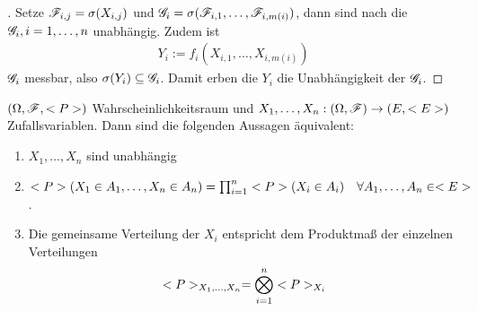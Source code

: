 \begin{proof}[]
	Setze $\F_{i,j} = \sigma(X_{i,j})$ und $\G_i = \sigma(\F_{i,1}, \dots, \F_{i,m(i)})$, dann sind nach  die $\G_i, i = 1,\dots,n$ unabhängig. Zudem ist
	\begin{align*}
	Y_i := f_i(X_{i,1}, \dots, X_{i,m(i)})
	\end{align*}
	$\G_i$ messbar, also $\sigma(Y_i) \subseteq \G_i$. Damit erben die $Y_i$ die Unabhängigkeit der $\G_i$.
\end{proof}
\begin{proposition}
	$(\O, \F, \P)$ Wahrscheinlichkeitsraum und $X_1, \dots, X_n: (\O,\F) \to (E, \E)$ Zufallsvariablen. Dann sind die folgenden Aussagen äquivalent:
	\begin{enumerate}
		\item $X_1, \dots, X_n$ sind unabhängig \label{prop:unabhZV1}
		\item $\P(X_1 \in A_1, \dots, X_n \in A_n) = \prod_{i=1}^n \P(X_i \in A_i)\quad \forall A_1, \dots, A_n \in \E$. \label{prop:unabhZV2}
		\item Die gemeinsame Verteilung der $X_i$ entspricht dem Produktmaß der einzelnen Verteilungen \label{prop:unabhZV3}
		\begin{align*}
			\P_{X_1, \dots, X_n} = \bigotimes_{i=1}^n \P_{X_i}
		\end{align*}
	\end{enumerate}
\end{proposition}
